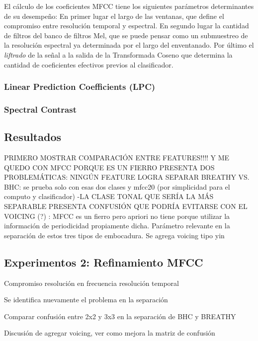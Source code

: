 \documentclass{article}
\begin{document}
El cálculo de los coeficientes MFCC tiene los siguientes parámetros determinantes de su desempeño: En primer lugar el largo de las ventanas, que define el compromiso entre resolución temporal y espectral. En segundo lugar la cantidad de filtros del banco de filtros Mel, que se puede pensar como un submuestreo de la resolución espectral ya determinada por el largo del enventanado. Por último el \textit{liftrado} de la señal a la salida de la Transformada Coseno que determina la cantidad de coeficientes efectivos previos al clasificador.

 

\subsubsection{Linear Prediction Coefficients (LPC)}
\subsubsection{Spectral Contrast \citep{jiang2002music}}

\subsection{Resultados}
PRIMERO MOSTRAR COMPARACIÓN ENTRE FEATURES!!!!
Y ME QUEDO CON MFCC PORQUE ES UN FIERRO
PRESENTA DOS PROBLEMÁTICAS: 
NINGÚN FEATURE LOGRA SEPARAR BREATHY VS. BHC: se prueba solo con esas dos clases y mfcc20 (por simplicidad para el computo y clasificador) 
-LA CLASE TONAL QUE SERÍA LA MÁS SEPARABLE PRESENTA CONFUSIÓN QUE PODRÍA EVITARSE CON EL VOICING (?) : MFCC es un fierro pero apriori no tiene porque utilizar la información de periodicidad propiamente dicha. Parámetro relevante en la separación de estos tres tipos de embocadura. Se agrega voicing tipo yin \cite{de2002yin}
 
\subsection{Experimentos 2: Refinamiento MFCC}
Compromiso resolución en frecuencia resolución temporal




Se identifica nuevamente el problema en la separación

Comparar confusión entre 2x2 y 3x3 en la separación de BHC y BREATHY

Discusión de agregar voicing, ver como mejora la matriz de confusión 

\subsubsection{}
\end{document}
